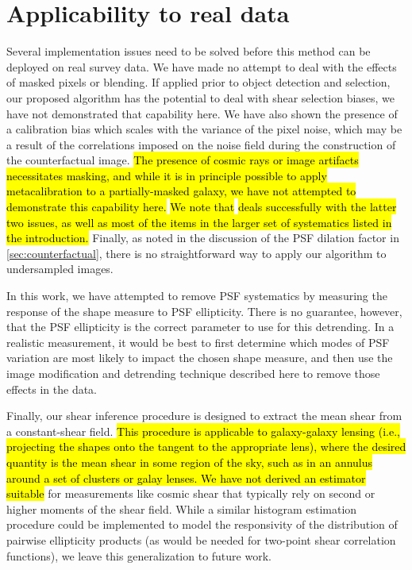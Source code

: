 \documentclass[iop]{emulateapj}
\begin{document}
\section{Applicability to real data}
\label{sec:appplicability}
Several implementation issues need to be solved before this method can
be deployed on real survey data. We have made no attempt to deal with
the effects of masked pixels or blending.  If applied prior to object
detection and selection, our proposed algorithm has the potential to
deal with shear selection biases, we have not demonstrated that
capability here. We have also shown the presence of a calibration bias
which scales with the variance of the pixel noise, which may be a
result of the correlations imposed on the noise field during the
construction of the counterfactual image. \hl{The presence of cosmic
  rays or image artifacts necessitates masking, and while it is in
  principle possible to apply metacalibration to a partially-masked
  galaxy, we have not attempted to demonstrate this capability here.}
\hl{We note that} \citealt{metacalII} \hl{ deals successfully with
  the latter two issues, as well as most of the items in the larger
  set of systematics listed in the introduction.} Finally, as noted
in the discussion of the PSF dilation factor in
\ref{sec:counterfactual}, there is no straightforward way to apply our
algorithm to undersampled images.

In this work, we have attempted to remove PSF systematics by measuring
the response of the shape measure to PSF ellipticity. There is no
guarantee, however, that the PSF ellipticity is the correct parameter
to use for this detrending. In a realistic measurement, it would be
best to first determine which modes of PSF variation are most likely
to impact the chosen shape measure, and then use the image
modification and detrending technique described here to remove those
effects in the data.

Finally, our shear inference procedure is designed to extract the mean
shear from a constant-shear field. \hl{This procedure is applicable to
galaxy-galaxy lensing (i.e., projecting the shapes onto the tangent to
the appropriate lens), where the desired quantity is the mean shear in
some region of the sky, such as in an annulus around a set of clusters
or galay lenses. We have not derived an estimator suitable} for
measurements like cosmic shear that typically rely on second or higher
moments of the shear field. While a similar histogram estimation
procedure could be implemented to model the responsivity of the
distribution of pairwise ellipticity products (as would be needed for
two-point shear correlation functions), we leave this generalization
to future work.
\end{document}
